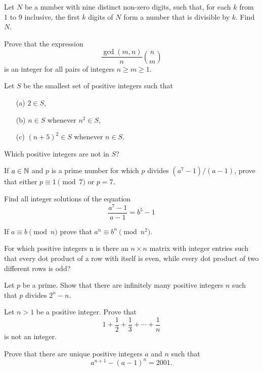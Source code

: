 \documentclass{article}
\begin{document}
    \begin{exercise}
        Let \(N\) be a number with nine distinct non-zero digits, such that, for each \(k\) from 1 to 9 inclusive, the first \(k\) digits of \(N\) form a number that is divisible by \(k\). 
        Find \(N\).
    \end{exercise}

    \begin{exercise}[2000 B2]
        Prove that the expression
        \[\frac{\gcd(m,n)}{n}\binom{n}{m}\]
        is an integer for all pairs of integers \(n\geq m\geq 1\).
    \end{exercise}

    \begin{exercise}[2017 A1]
        Let \(S\) be the smallest set of positive integers such that
        \begin{enumerate}
            \item[(a)] \(2\in S\),
            \item[(b)] \(n\in S\) whenever \(n^2\in S\),
            \item[(c)] \((n+5)^2\in S\) whenever \(n\in S\).
        \end{enumerate}
        Which positive integers are not in \(S\)?
    \end{exercise}
    
    \begin{exercise}
        If $a\in \mathbb{N}$ and $p$ is a prime number for which $p$ divides $(a^7-1)/(a-1)$, prove that either $p \equiv 1 \pmod{7}$ or $p=7$.
    \end{exercise}
    
    \begin{exercise}
        Find all integer solutions of the equation
        \[\frac{a^7-1}{a-1} = b^5-1\]
    \end{exercise}
    
    \begin{exercise}
        If $a\equiv b \pmod{n}$ prove that $a^n \equiv b^n \pmod{n^2}$.
    \end{exercise}

    \begin{exercise}[2011 A4]
        For which positive integers n is there an \(n\times n\) matrix with integer entries such that every dot product of a row with itself is even, while every dot product of two different rows is odd?
    \end{exercise}
    
    \begin{exercise}
        Let $p$ be a prime. Show that there are infinitely many positive integers $n$ such that $p$ divides $2^n-n$.
    \end{exercise}
    
    \begin{exercise}
        Let $n>1$ be a positive integer. Prove that 
        \[1+\frac{1}{2}+\frac{1}{3}+\cdots + \frac{1}{n}\] is not an integer.
    \end{exercise}

    \begin{exercise}[2001 A5]
        Prove that there are unique positive integers \(a\) and \(n\) such that 
        \[a^{n+1}-(a-1)^n = 2001.\]
    \end{exercise}
\end{document}
